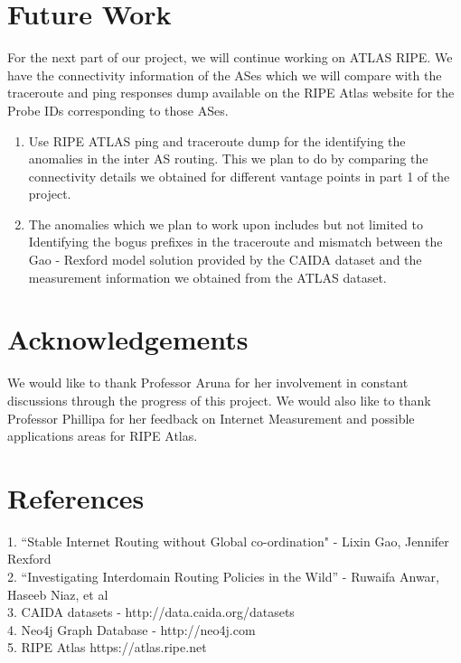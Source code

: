 \documentclass{sig-alternate-05-2015}
\begin{document}
\section{Future Work}
For the next part of our project, we will continue working on ATLAS RIPE. We have the connectivity information of the ASes which we will compare with the traceroute and ping responses dump available on the RIPE Atlas website for the Probe IDs corresponding to those ASes.
\begin{enumerate}
\item Use RIPE ATLAS ping and traceroute dump for the identifying the anomalies in the inter AS routing. This we plan to do by comparing the connectivity details we obtained for different vantage points in part 1 of the project. 
\item The anomalies which we plan to work upon includes but not limited to Identifying the bogus prefixes in the traceroute and mismatch between the Gao - Rexford model solution provided by the CAIDA dataset and the measurement information we obtained from the ATLAS dataset.


\end{enumerate}

\section{Acknowledgements}
We would like to thank Professor Aruna for her involvement in constant discussions through the progress of this project. We would also like to thank Professor Phillipa for her feedback on Internet Measurement and possible applications areas for RIPE Atlas.



\section{References}
1. ``Stable Internet Routing without Global co-ordination" - Lixin Gao, Jennifer Rexford\\
2. ``Investigating Interdomain Routing Policies in the Wild'' - Ruwaifa Anwar, Haseeb Niaz, et al\\
3. CAIDA datasets - http://data.caida.org/datasets \\
4. Neo4j Graph Database - http://neo4j.com\\
5. RIPE Atlas https://atlas.ripe.net\\
\end{document}
